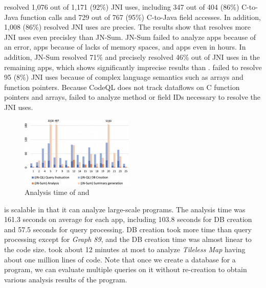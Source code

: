 \ours resolved 1,076 out of 1,171 (92\%) JNI uses, including 347 out of 404
(86\%) C-to-Java function calls and 729 out of 767 (95\%) C-to-Java field
accesses. In addition, 1,008 (86\%) resolved JNI uses are precies.  The results
show that \ours resolves more JNI uses even precisley than JN-Sum. JN-Sum
failed to analyze  apps because of an error,  apps because of
lacks of memory spaces, and  apps even in  hours.  In
addition, JN-Sum resolved 71\% and precisely resolved 46\% out of JNI uses in
the remaining  apps, which shows significantly imprecise results
than \ours. \ours failed to resolve 95 (8\%) JNI uses because of complex
language semantics such as arrays and function pointers.  Because CodeQL does
not track dataflows on C function pointers and arrays, \ours failed to analyze
method or field IDs necessary to resolve the JNI uses.


\begin{figure}[t]
  \centering
  \vspace{2mm}
  \includegraphics[width=0.48\textwidth]{img/graph}
  \vspace*{-1.5em}
  \caption{Analysis time of \ours and \lees}
  \label{fig:graph}
\vspace*{-.5em}
\end{figure}

\ours is scalable in that it can analyze large-scale programs. The analysis
time was 161.3 seconds on average for each app, including 103.8 seconds for DB
creation and 57.5 seconds for query processing.  DB creation took more time
than query processing except for {\it Graph 89}, and the DB creation time was
almost linear to the code size. \ours took about 12 minutes at most to analyze
{\it Tileless Map} having about one million lines of code.  Note that once we
create a database for a program, we can evaluate multiple queries on it without
re-creation to obtain various analysis results of the program.


